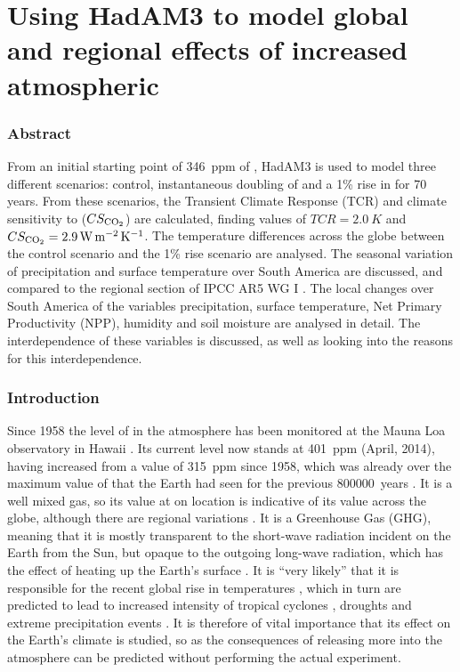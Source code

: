 \documentclass{article}
\begin{document}
\part*{Using HadAM3 to model global and regional effects of increased atmospheric }

\section*{Abstract}

From an initial starting point of \SI{346}{ppm} of , HadAM3 is used to model three different scenarios: control, instantaneous doubling of  and a 1\% rise in  for 70 years. From these scenarios, the Transient Climate Response (TCR) and climate sensitivity to  ($CS_{\ce{CO2}}$) are calculated, finding values of $TCR = \SI{2.0}{K}$ and $CS_{\ce{CO2}} = \SI{2.9}{W.m^{-2}.K^{-1}}$. The temperature differences across the globe between the control scenario and the 1\% rise scenario are analysed. The seasonal variation of precipitation and surface temperature over South America are discussed, and compared to the regional section of IPCC AR5 WG I \parencite{ipcc2014wg1}. The local changes over South America of the variables precipitation, surface temperature, Net Primary Productivity (NPP), humidity and soil moisture are analysed in detail. The interdependence of these variables is discussed, as well as looking into the reasons for this interdependence.

\section{Introduction}

Since 1958 the level of  in the atmosphere has been monitored at the Mauna Loa observatory in Hawaii \parencite{keeling1976atmospheric}. Its current level now stands at \SI{401}{ppm} (April, 2014), having increased from a value of \SI{315}{ppm} since 1958, which was already over the maximum value of  that the Earth had seen for the previous \SI{800 000}{years} \parencite{yin2012individual}. It is a well mixed gas, so its value at on location is indicative of its value across the globe, although there are regional variations \parencite{gurney2002towards}. It is a Greenhouse Gas (GHG), meaning that it is mostly transparent to the short-wave radiation incident on the Earth from the Sun, but opaque to the outgoing long-wave radiation, which has the effect of heating up the Earth's surface \parencite{neelin2011climate}. It is ``very likely'' that it is responsible for the recent global rise in temperatures \parencite{ipcc2014wg1}, which in turn are predicted to lead to increased intensity of tropical cyclones \parencite{knutson2010tropical}, droughts \parencite{dai2012increasing} and extreme precipitation events \parencite{shongwe2009projected}. It is therefore of vital importance that its effect on the Earth's climate is studied, so as the consequences of releasing more  into the atmosphere can be predicted without performing the actual experiment.
\end{document}
